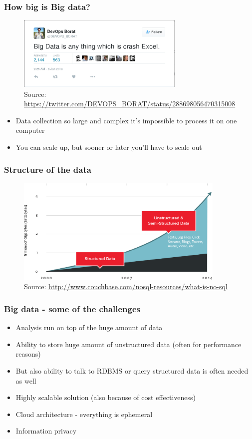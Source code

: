 \documentclass[10pt,utf8]{beamer}
\begin{document}
\begin{frame}
	\frametitle{How big is Big data?}
	 {
		\begin{figure}
			\centering
			\includegraphics[width=8cm]{./img/borat_big_data.eps}
			\caption{\tiny{Source: \url{https://twitter.com/DEVOPS\_BORAT/status/288698056470315008}}}
		\end{figure}
	}
	 {
		\begin{itemize}
			\item Data collection so large and complex it's impossible to process it on one computer
			\item You can scale up, but sooner or later you'll have to scale out
		\end{itemize}
	}
\end{frame}

\begin{frame}
	\frametitle{Structure of the data}
	\begin{figure}
		\centering
		\includegraphics[width=10cm]{./img/why-nosql-2.eps}
		\caption{\tiny{Source: \url{http://www.couchbase.com/nosql-resources/what-is-no-sql}}}
	\end{figure}
\end{frame}

\begin{frame}
	\frametitle{Big data - some of the challenges}
		\begin{itemize}
			\item Analysis run on top of the huge amount of data
			\item Ability to store huge amount of unstructured data (often for performance reasons)
			\item But also ability  to talk to RDBMS or query structured data is often needed as well
			\item Highly scalable solution (also because of cost effectiveness)
			\item Cloud architecture - everything is ephemeral
			\item Information privacy
		\end{itemize}
\end{frame}
\end{document}
